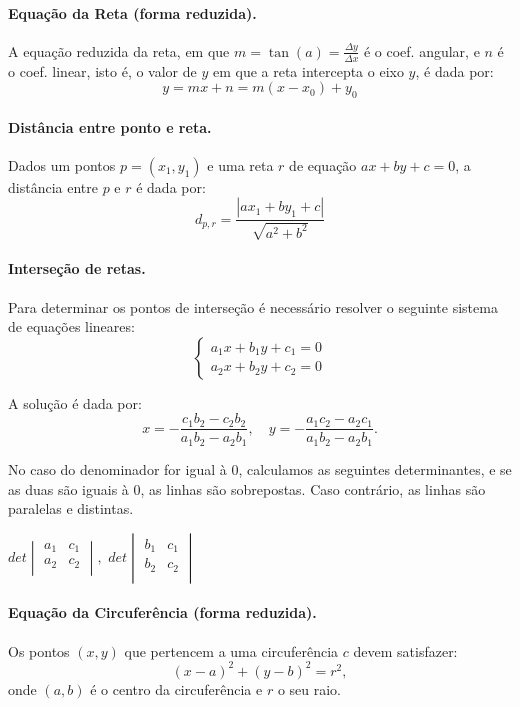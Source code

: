 \paragraph{Equação da Reta (forma reduzida).} A equação reduzida da reta, em que $m = \tan(a) = \frac{\Delta y}{\Delta x}$ é o coef. angular, e $n$ é o coef. linear, isto é, o valor de $y$ em que a reta intercepta o eixo $y$, é dada por:
		$$y = mx + n = m(x - x_0) +y_0$$

\paragraph{Distância entre ponto e reta.} Dados um pontos $p = (x_1,y_1)$ e uma reta $r$ de equação $ax+by+c=0$, a distância entre $p$ e $r$ é dada por:
		$$d_{p,r} = \frac{|ax_1+by_1+c|}{\sqrt{a^2+b^2}}$$

\paragraph{Interseção de retas.} Para determinar os pontos de interseção é necessário resolver o seguinte sistema de equações lineares:
$$
\begin{cases}
	a_1x + b_1y + c_1 = 0 \\
	a_2x + b_2y + c_2 = 0
\end{cases}
$$

A solução é dada por:
$$x = -\frac{c_1b_2 - c_2b_2}{a_1b_2 - a_2b_1}, \quad y = -\frac{a_1c_2 - a_2c_1}{a_1b_2 - a_2b_1}.$$

No caso do denominador for igual à 0, calculamos as seguintes determinantes, e se as duas são iguais à 0, as linhas são sobrepostas. Caso contrário, as linhas são paralelas e distintas.

\begin{center}
	$det
	\begin{vmatrix}
		a_1 & c_1 \\
		a_2 & c_2 \\
	\end{vmatrix}, 
	$
	$det
	\begin{vmatrix}
		b_1 & c_1 \\
		b_2 & c_2 \\
	\end{vmatrix}
	$
\end{center}

\paragraph{Equação da Circuferência (forma reduzida).} Os pontos $(x,y)$ que pertencem a uma circuferência $c$ devem satisfazer:
		$$(x-a)^2+(y-b)^2 = r^2,$$
		onde $(a,b)$ é o centro da circuferência e $r$ o seu raio.

